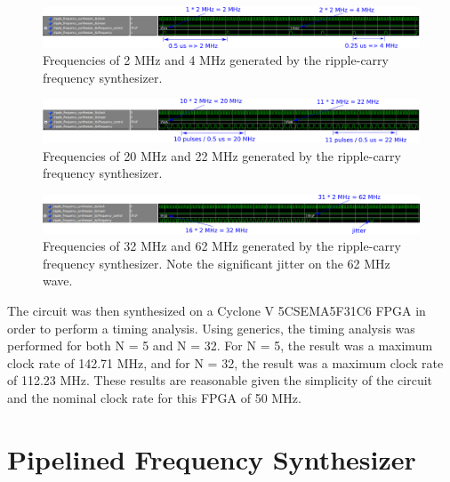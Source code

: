 \documentclass[a4paper, 10pt, titlepage]{article}
\begin{document}
\begin{figure}[!htb]
    \centering
    \includegraphics[width=\linewidth]{ripple_2_4_MHz.PNG}
    \caption{Frequencies of 2 MHz and 4 MHz generated by the ripple-carry frequency synthesizer.}
    \label{fig:ripple_1}
\end{figure}
\begin{figure}[!htb]
    \centering
    \includegraphics[width=\linewidth]{ripple_20_22_MHz.PNG}
    \caption{Frequencies of 20 MHz and 22 MHz generated by the ripple-carry frequency synthesizer.}
    \label{fig:ripple_2}
\end{figure}
\begin{figure}[!htb]
    \centering
    \includegraphics[width=\linewidth]{ripple_32_62_MHz.PNG}
    \caption{Frequencies of 32 MHz and 62 MHz generated by the ripple-carry frequency synthesizer. Note the significant jitter on the 62 MHz wave.}
    \label{fig:ripple_3}
\end{figure}

The circuit was then synthesized on a Cyclone V 5CSEMA5F31C6 FPGA in order to perform a timing analysis. Using generics, the timing analysis was performed for both N = 5 and N = 32. For N = 5, the result was a maximum clock rate of 142.71 MHz, and for N = 32, the result was a maximum clock rate of 112.23 MHz. These results are reasonable given the simplicity of the circuit and the nominal clock rate for this FPGA of 50 MHz.

\section{Pipelined Frequency Synthesizer}
\end{document}
